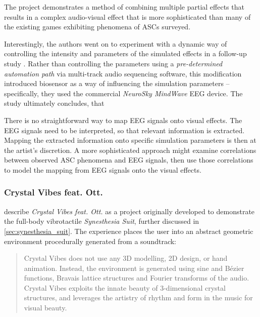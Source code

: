 The project demonstrates a method of combining multiple partial effects that results in a complex audio-visual effect that is more sophisticated than many of the existing games exhibiting phenomena of \acp{ASC} surveyed.

Interestingly, the authors went on to experiment with a dynamic way of controlling the intensity and parameters of the simulated effects in a follow-up study \autocite{weinel2015quake}. Rather than controlling the parameters using a \textit{pre-determined automation path} via multi-track audio sequencing software, this modification introduced biosensor as a way of influencing the simulation parameters -- specifically, they used the commercial \textit{NeuroSky MindWave} \ac{EEG} device. The study ultimately concludes, that 

There is no straightforward way to map \ac{EEG} signals onto visual effects. The \ac{EEG} signals need to be interpreted, so that relevant information is extracted. Mapping the extracted information onto specific simulation parameters is then at the artist's discretion. A more sophisticated approach might examine correlations between observed \ac{ASC} phenomena and \ac{EEG} signals, then use those correlations to model the mapping from \ac{EEG} signals onto the visual effects.

\subsubsection{Crystal Vibes feat. Ott.}\label{sec:crystal_vibes}
\textcite{outram2017crystal} describe \textit{Crystal Vibes feat. Ott.} as a project originally developed to demonstrate the full-body vibrotactile \textit{Synesthesia Suit}, further discussed in \ref{sec:synesthesia_suit}. The experience places the user into an abstract geometric environment procedurally generated from a soundtrack:

\begin{quote}
    Crystal Vibes does not use any 3D modelling, 2D design, or hand animation. Instead, the environment is generated using sine and Bézier functions, Bravais lattice structures and Fourier transforms of the audio. Crystal Vibes exploits the innate beauty of 3-dimensional crystal structures, and leverages the artistry of rhythm and form in the music for visual beauty.
\end{quote}

